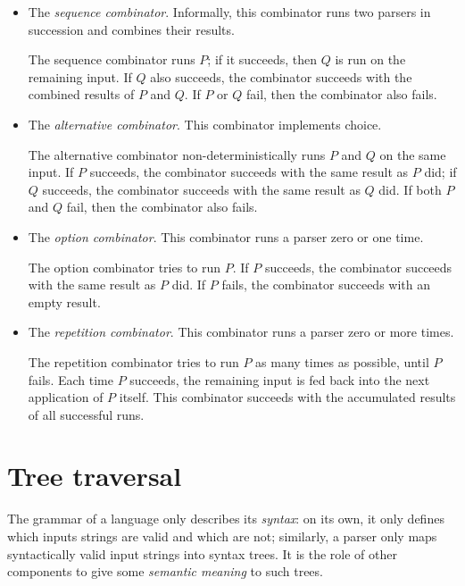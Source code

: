 \documentclass[UdineBachThesis,american,11pt]{PhdThesis}
\begin{document}
  \begin{itemize}
    \item The \emph{sequence combinator}. Informally, this combinator runs two
    parsers in succession and combines their results.

    The sequence combinator runs $P$; if it succeeds, then $Q$ is run on the
    remaining input. If $Q$ also succeeds, the combinator succeeds with the
    combined results of $P$ and $Q$\@. If $P$ or $Q$ fail, then the combinator
    also fails.

    \item The \emph{alternative combinator}. This combinator implements choice.

    The alternative combinator non-deterministically runs $P$ and $Q$ on the
    same input. If $P$ succeeds, the combinator succeeds with the same result as
    $P$ did; if $Q$ succeeds, the combinator succeeds with the same result as
    $Q$ did. If both $P$ and $Q$ fail, then the combinator also fails.

    \item The \emph{option combinator}. This combinator runs a parser zero or
    one time.

    The option combinator tries to run $P$\@. If $P$ succeeds, the combinator
    succeeds with the same result as $P$ did. If $P$ fails, the combinator
    succeeds with an empty result.

    \item The \emph{repetition combinator}. This combinator runs a parser zero
    or more times.

    The repetition combinator tries to run $P$ as many times as possible, until
    $P$ fails. Each time $P$ succeeds, the remaining input is fed back into the
    next application of $P$ itself. This combinator succeeds with the
    accumulated results of all successful runs.
  \end{itemize}

  \newpage

  \section{Tree traversal}

  The grammar of a language only describes its \emph{syntax}: on its own, it
  only defines which inputs strings are valid and which are not; similarly, a
  parser only maps syntactically valid input strings into syntax trees. It is
  the role of other components to give some \emph{semantic meaning} to such
  trees.
\end{document}
